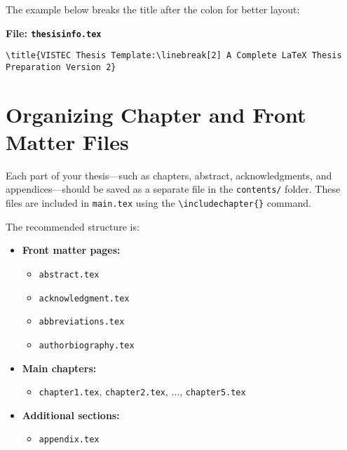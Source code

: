 \documentclass{VISTEC}
\begin{document}
\begin{paragraph}
The example below breaks the title after the colon for better layout:
\end{paragraph}

\noindent\textbf{File: \texttt{thesisinfo.tex}}\vspace{-1.5em}
\begin{verbatim}
\title{VISTEC Thesis Template:\linebreak[2] A Complete LaTeX Thesis Preparation Version 2}
\end{verbatim}


\section{Organizing Chapter and Front Matter Files}
\label{manual:chapters}

\begin{paragraph}
Each part of your thesis—such as chapters, abstract, acknowledgments, and appendices—should be saved as a separate file in the \texttt{contents/} folder. These files are included in \texttt{main.tex} using the \verb|\includechapter{}| command.
\end{paragraph}

\begin{paragraph}
The recommended structure is:
\end{paragraph}

\begin{itemize}[leftmargin=\paritemindent]
    \item \textbf{Front matter pages:}
    \begin{itemize}[leftmargin=0.5cm]
        \item \texttt{abstract.tex}
        \item \texttt{acknowledgment.tex}
        \item \texttt{abbreviations.tex}
        \item \texttt{authorbiography.tex}
    \end{itemize}
    
    \item \textbf{Main chapters:}
    \begin{itemize}[leftmargin=0.5cm]
        \item \texttt{chapter1.tex}, \texttt{chapter2.tex}, ..., \texttt{chapter5.tex}
    \end{itemize}
    
    \item \textbf{Additional sections:}
    \begin{itemize}[leftmargin=0.5cm]
        \item \texttt{appendix.tex}
    \end{itemize}
\end{itemize}
\end{document}
